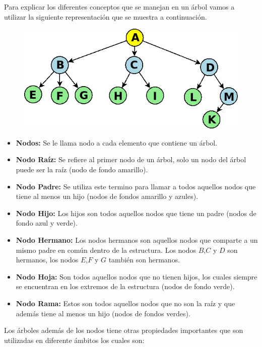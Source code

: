 Para explicar los diferentes conceptos que se manejan en un árbol vamos a utilizar la siguiente representación que se muestra a continuación.

\begin{figure}[h!]
	\centering
	\includegraphics[width=0.7\linewidth]{img/tree_example}
	\label{fig:treeexample}
\end{figure}

\begin{itemize}
	\item \textbf{Nodos:} Se le llama nodo a cada elemento que contiene un árbol.
	
	\item \textbf{Nodo Raíz:} Se refiere al primer nodo de un árbol, solo un nodo del árbol puede ser la raíz (nodo de fondo amarillo). 
	
	\item \textbf{Nodo Padre:} Se utiliza este termino para llamar a todos aquellos nodos que tiene al menos un hijo (nodos de fondos amarillo y azules).
	
	\item \textbf{Nodo Hijo:} Los hijos son todos aquellos nodos que tiene un padre (nodos de fondo azul y verde).
	
	\item \textbf{Nodo Hermano:} Los nodos hermanos son aquellos nodos que comparte a un mismo padre en común dentro de la estructura. Los nodos $B$,$C$ y $D$ son hermanos, los nodos $E$,$F$ y $G$ también son hermanos.
	
	\item \textbf{Nodo Hoja:} Son todos aquellos nodos que no tienen hijos, los cuales siempre se encuentran en los extremos de la estructura (nodos de fondo verde).
	
	\item \textbf{Nodo Rama:} Estos son todos aquellos nodos que no son la raíz  y que además tiene al menos un hijo (nodos de fondos verdes).
\end{itemize}

Los árboles además de los nodos tiene otras propiedades importantes que son utilizadas en diferente ámbitos los cuales son:

